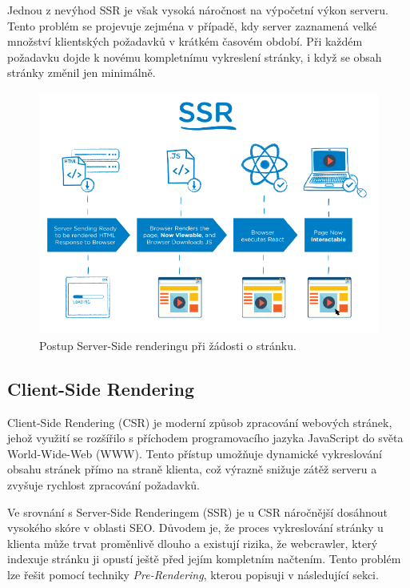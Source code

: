 Jednou z nevýhod SSR je však vysoká náročnost na výpočetní výkon serveru. Tento problém se projevuje zejména v případě, kdy server zaznamená velké množství klientských požadavků v krátkém časovém období. Při každém požadavku dojde k novému kompletnímu vykreslení stránky, i když se obsah stránky změnil jen minimálně.

\begin{figure}[H]
    \centering
    \includegraphics[width=1.0\textwidth]{figures/server-side-rendering}
    \caption{Postup Server-Side renderingu při žádosti o stránku. \cite{rendering-diff}}
    \label{fig:server-side-rendering}
\end{figure}

\subsection{Client-Side Rendering}
\label{subsec:dev-request-processing-client-side-rendering}
Client-Side Rendering (CSR) je moderní způsob zpracování webových stránek, jehož využití se rozšířilo s příchodem programovacího jazyka JavaScript do světa World-Wide-Web (WWW). Tento přístup umožňuje dynamické vykreslování obsahu stránek přímo na straně klienta, což výrazně snižuje zátěž serveru a zvyšuje rychlost zpracování požadavků.

Ve srovnání s Server-Side Renderingem (SSR) je u CSR náročnější dosáhnout vysokého skóre v oblasti SEO. Důvodem je, že proces vykreslování stránky u klienta může trvat proměnlivě dlouho a existují rizika, že webcrawler, který indexuje stránku ji opustí ještě před jejím kompletním načtením. Tento problém lze řešit pomocí techniky \textit{Pre-Rendering}, kterou popisuji v následující sekci.

